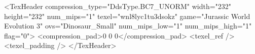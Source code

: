 <TexHeader compression_type="DdsType.BC7_UNORM" width="232" height="232" num_mips="1" texel="wnl8lyc1tu3dsokz" game="Jurassic World Evolution 3" ovs="Dinosaur_Small" num_mips_low="1" num_mips_high="1" flag="0">
	<compression_pad>0 0 0</compression_pad>
	<texel_ref />
	<texel_padding />
</TexHeader>
